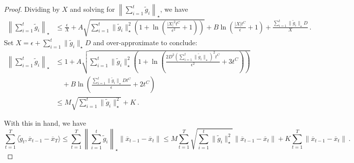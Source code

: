 \documentclass[12pt]{colt2018} %
\begin{document}
\begin{proof}
Dividing by $X$ and solving for $\left\|\sum_{i=1}^t\tilde g_i\right\|_\star$, we have
\begin{align*}
\left\|\sum_{i=1}^t\tilde g_i\right\|_\star 
&\le \frac{\epsilon}{X} + A\sqrt{\sum_{i=1}^t \|\tilde{g}_i\|_\star^2\left(1+\ln\left(\frac{|X|^2t^C}{\epsilon^2}+1\right)\right)} + B\ln\left(\frac{|X|t^C}{\epsilon}+1\right) +\frac{\sum_{i=1}^t \|\tilde{g}_i\|_\star D}{X}~.
\end{align*}
Set $X=\epsilon +\sum_{i=1}^t \|\tilde{g}_i\|_\star D$ and over-approximate to conclude:
\begin{align*}
\left\|\sum_{i=1}^t\tilde g_i\right\|_\star 
&\le 1 + A\sqrt{\sum_{i=1}^t \|\tilde{g}_i\|_\star^2\left(1+\ln\left(\frac{2D^2\left(\sum_{i=1}^t\|\tilde{g}_i\|_\star\right)^2t^C}{\epsilon^2}+3t^C\right)\right)} \\
&\quad + B\ln\left(\frac{\sum_{i=1}^t \|\tilde{g}_i\|_\star Dt^C}{\epsilon}+2t^C\right)\\
&\le M\sqrt{\sum_{i=1}^t\|\tilde{g}_i\|_\star^2} + K~.
\end{align*}

With this in hand, we have
\begin{equation}
\sum_{t=1}^T \langle \tilde{g}_t, \overline{x}_{t-1}-\overline{x}_T\rangle 
\le \sum_{t=1}^{T} \left\|\sum_{i=1}^t \tilde{g}_i\right\|_\star \|\overline{x}_{t-1}-\overline{x}_t\|
\le M\sum_{t=1}^{T}\sqrt{\sum_{i=1}^t \|\tilde{g}_i\|^2_\star }\|\overline{x}_{t-1}-\overline{x}_t\| + K \sum_{t=1}^{T}\|\overline{x}_{t-1}-\overline{x}_t\|~.\label{eqn:telescoped}
\end{equation}


\end{proof}
\end{document}
